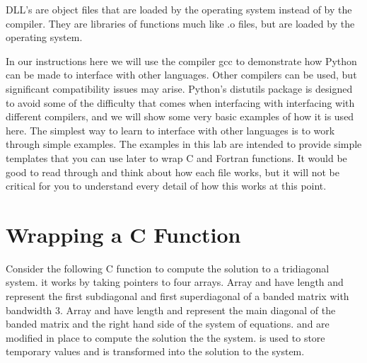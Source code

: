 DLL's are object files that are loaded by the operating system instead of by the compiler.
They are libraries of functions much like .o files, but are loaded by the operating system.

In our instructions here we will use the compiler gcc to demonstrate how Python can be made to interface with other languages.
Other compilers can be used, but significant compatibility issues may arise.
Python's distutils package is designed to avoid some of the difficulty that comes when interfacing with interfacing with different compilers, and we will show some very basic examples of how it is used here.
The simplest way to learn to interface with other languages is to work through simple examples.
The examples in this lab are intended to provide simple templates that you can use later to wrap C and Fortran functions.
It would be good to read through and think about how each file works, but it will not be critical for you to understand every detail of how this works at this point.

\section*{Wrapping a C Function}

Consider the following C function to compute the solution to a tridiagonal system.
it works by taking pointers to four arrays.
Array  and  have length  and represent the first subdiagonal and first superdiagonal of a banded matrix with bandwidth 3.
Array  and  have length and represent the main diagonal of the banded matrix and the right hand side of the system of equations.
 and  are modified in place to compute the solution the the system.
 is used to store temporary values and  is transformed into the solution to the system.



